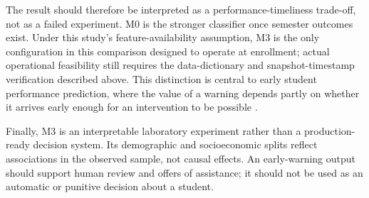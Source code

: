The result should therefore be interpreted as a performance-timeliness
trade-off, not as a failed experiment. M0 is the stronger classifier once
semester outcomes exist. Under this study's feature-availability assumption,
M3 is the only configuration in this comparison designed to operate at
enrollment; actual operational feasibility still requires the data-dictionary
and snapshot-timestamp verification described above. This distinction is central to early student
performance prediction, where the value of a warning depends partly on
whether it arrives early enough for an intervention to be possible
\citep{martins2021early}.

Finally, M3 is an interpretable laboratory experiment rather than a
production-ready decision system. Its demographic and socioeconomic splits
reflect associations in the observed sample, not causal effects. An
early-warning output should support human review and offers of assistance; it
should not be used as an automatic or punitive decision about a student.

